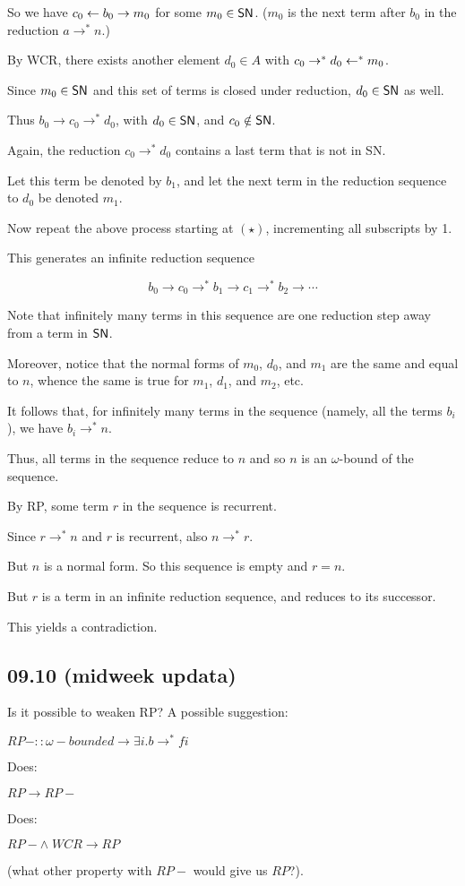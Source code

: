 \documentclass{scrartcl}
\begin{document}
\begin{itemize}
  So we have $c_0 \leftarrow b_0 \to m_0$ for some $m_0 \in \mathsf{SN}$. ($m_0$ is the next term after $b_0$ in the reduction $a \to^* n$.)

  By WCR, there exists another element $d_0 \in A$ with $c_0 \to^* d_0 \leftarrow^* m_0$.

  Since $m_0 \in \mathsf{SN}$ and this set of terms is closed under reduction, $d_0 \in \mathsf{SN}$ as well.

  Thus $b_0 \to c_0 \to^* d_0$, with $d_0 \in \mathsf{SN}$, and $c_0 \notin \mathsf{SN}$.

  Again, the reduction $c_0 \to^* d_0$ contains a last term that is not in SN.

  Let this term be denoted by $b_1$, and let the next term in the reduction sequence
  to $d_0$ be denoted $m_1$.

  Now repeat the above process starting at $(\star)$, incrementing all subscripts by 1.

  This generates an infinite reduction sequence

  \[b_0 \to c_0 \to^* b_1 \to c_1 \to^* b_2 \to \cdots \]

  Note that infinitely many terms in this sequence are one reduction step
  away from a term in $\mathsf{SN}$.

  Moreover, notice that the normal forms of $m_0$, $d_0$, and $m_1$ are the same
  and equal to $n$, whence the same is true for $m_1$, $d_1$, and $m_2$, etc.

  It follows that, for infinitely many terms in the sequence
  (namely, all the terms $b_i$), we have $b_i \to^* n$.

  Thus, all terms in the sequence reduce to $n$ and so $n$ is an $\omega$-bound
  of the sequence.

  By RP, some term $r$ in the sequence is recurrent.

  Since $r \to^* n$ and $r$ is recurrent, also $n \to^* r$.

  But $n$ is a normal form.  So this sequence is empty and $r=n$.

  But $r$ is a term in an infinite reduction sequence, and reduces to its successor.

  This yields a contradiction.

\end{itemize}
\subsection{09.10 (midweek updata)}
Is it possible to weaken RP? A possible suggestion:

$RP- :: \omega-bounded \to  \exists i. b \to^* f i$

Does:

$RP \to RP-$

Does:

$RP- \land \; WCR \to RP$

(what other property with $RP-$ would give us $RP$?).
\end{document}
